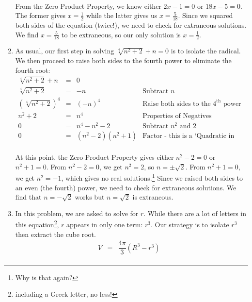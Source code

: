 \begin{ex}
\begin{enumerate}
\[\begin{array}{rclr}
\end{array} \] From the Zero Product Property, we know either $2x-1 = 0$ or $18x - 5 = 0$.  The former gives $x = \frac{1}{2}$ while the latter gives us $x = \frac{5}{18}$.  Since we squared both sides of the equation (twice!), we need to check for extraneous solutions.  We find $x = \frac{5}{18}$ to be extraneous, so our only solution is $x = \frac{1}{2}$.

\item As usual, our first step in solving $\sqrt[4]{n^2 + 2} + n = 0$ is to isolate the radical.  We then proceed to raise both sides to the fourth power to eliminate the fourth root:\[ \begin{array}{rclr}

\sqrt[4]{n^2 + 2} + n & = & 0 &  \\

\sqrt[4]{n^2 + 2} & = &  -n & \text{Subtract $n$} \\

(\sqrt[4]{n^2 + 2})^4 & = & (-n)^4 & \text{Raise both sides to the $4^{\text{th}}$ power} \\

n^2 + 2 & = & n^4 & \text{Properties of Negatives}\\

0 & = & n^{4} - n^2 - 2 & \text{Subtract $n^2$ and $2$} \\

0 & = & (n^2 - 2)(n^2 + 1) & \text{Factor - this is a `Quadratic in Disguise'} \\

\end{array} \]

At this point, the Zero Product Property gives either $n^2 - 2 = 0$ or $n^2 + 1 = 0$.  From $n^2 - 2 = 0$, we get $n^2 = 2$, so $n = \pm \sqrt{2}$.  From $n^2 + 1 = 0$, we get $n^2 = -1$, which gives no real solutions.\footnote{Why is that again?}  Since we raised both sides to an even (the fourth) power, we need to check for extraneous solutions. We find that $n = -\sqrt{2}$ works but $n = \sqrt{2}$ is extraneous.

\item In this problem, we are asked to solve for $r$. While there are a lot of letters in this equation\footnote{including a Greek letter, no less!}, $r$ appears in only one term:  $r^3$.  Our strategy is to isolate $r^3$ then extract the cube root.\[ \begin{array}{rclr}

V & = & \dfrac{4\pi}{3}(R^3 - r^3) & \\ [5pt]


\end{array}\]
\end{enumerate}
\end{ex}

